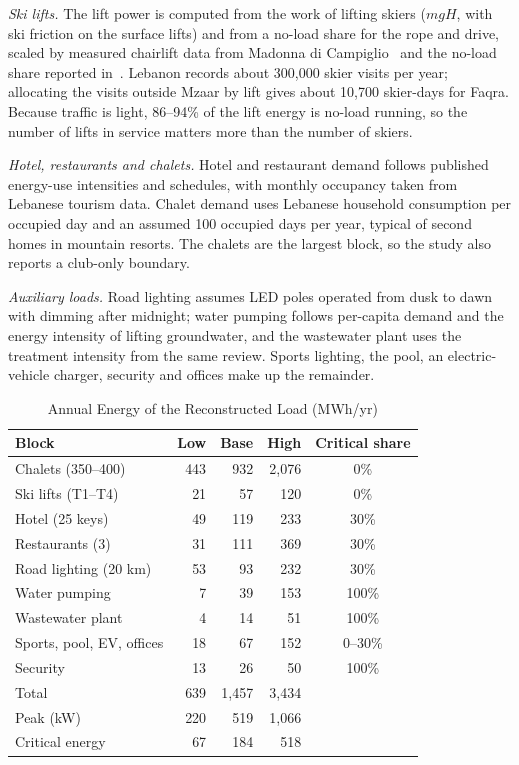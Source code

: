 \emph{Ski lifts.} The lift power is computed from the work of lifting skiers ($mgH$, with ski friction
on the surface lifts) and from a no-load share for the rope and drive, scaled by measured chairlift
data from Madonna di Campiglio~\cite{viesi2023} and the no-load share reported in~\cite{blasuttigh2023}.
Lebanon records about 300,000 skier visits per year;
allocating the visits outside Mzaar by lift gives about 10,700 skier-days for Faqra. Because traffic
is light, 86--94\% of the lift energy is no-load running, so the number of lifts in service matters
more than the number of skiers.

\emph{Hotel, restaurants and chalets.} Hotel and restaurant demand follows published energy-use
intensities and schedules, with monthly occupancy taken from
Lebanese tourism data. Chalet demand uses Lebanese household consumption per occupied
day and an assumed 100 occupied days per year, typical of second homes in
mountain resorts. The chalets are the largest block, so the study
also reports a club-only boundary.

\emph{Auxiliary loads.} Road lighting assumes LED poles operated from dusk to dawn with dimming after
midnight; water pumping follows per-capita demand and the energy intensity of lifting
groundwater, and the wastewater plant uses the treatment intensity from the same
review. Sports lighting, the pool, an electric-vehicle charger, security and offices make up the
remainder.

\begin{table}[!t]
\centering
\caption{Annual Energy of the Reconstructed Load (MWh/yr)}
\label{tab:load}
\footnotesize
\setlength{\tabcolsep}{3pt}
\begin{tabular}{@{}l r r r c@{}}
\toprule
Block & Low & Base & High & Critical share \\
\midrule
Chalets (350--400)            & 443 & 932   & 2,076 & 0\%   \\
Ski lifts (T1--T4)            & 21  & 57    & 120   & 0\%   \\
Hotel (25 keys)               & 49  & 119   & 233   & 30\%  \\
Restaurants (3)               & 31  & 111   & 369   & 30\%  \\
Road lighting (20 km)         & 53  & 93    & 232   & 30\%  \\
Water pumping                 & 7   & 39    & 153   & 100\% \\
Wastewater plant              & 4   & 14    & 51    & 100\% \\
Sports, pool, EV, offices     & 18  & 67    & 152   & 0--30\% \\
Security                      & 13  & 26    & 50    & 100\% \\
\midrule
Total                         & 639 & 1,457 & 3,434 & \\
Peak (kW)                     & 220 & 519   & 1,066 & \\
Critical energy               & 67  & 184   & 518   & \\
\bottomrule
\end{tabular}
\end{table}


